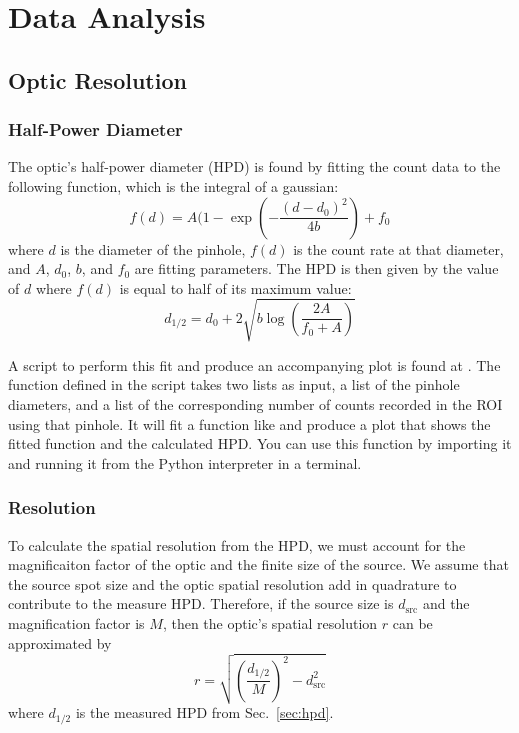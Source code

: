 \chapter{Data Analysis}



\section{Optic Resolution\label{sec:res}}

\subsection{Half-Power Diameter\label{sec:hpd}}

The optic's half-power diameter (HPD) is found by fitting the count data to
the following function, which is the integral of a gaussian:
\begin{equation}
  f(d) = A(1-\exp{\left(-\frac{(d-d_0)^2}{4b}\right)} + f_0
    \label{eq:hpd_fit}
\end{equation}
where $d$ is the diameter of the pinhole, $f(d)$ is the count rate at
that diameter, and $A$, $d_0$, $b$, and $f_0$ are fitting
parameters. The HPD is then given by the value of $d$ where $f(d)$ is
equal to half of its maximum value:
\begin{equation}
  \label{eq:hpd}
  d_{1/2} = d_0 + 2 \sqrt{b \log{ \left( \frac{2A}{f_0 + A} \right)}}
\end{equation}

A script to perform this fit and produce an accompanying plot is found at
. The  function defined in the
script takes two lists as input, a list of the pinhole diameters, and a list of
the corresponding number of counts recorded in the ROI using that pinhole. It
will fit a function like \label{eq:hpd_fit} and produce a plot that shows the
fitted function and the calculated HPD. You can use this function by importing
it and running it from the Python interpreter in a terminal.


\subsection{Resolution}

To calculate the spatial resolution from the HPD, we must account for the
magnificaiton factor of the optic and the finite size of the source.  We assume
that the source spot size and the optic spatial resolution add in quadrature to
contribute to the measure HPD. Therefore, if the source size is $d_\text{src}$
and the magnification factor is $M$, then the optic's spatial resolution $r$ can
be approximated by
\begin{equation}
  \label{eq:sp_res}
  r = \sqrt{ \left( \frac{d_{1/2}}{M} \right)^2 - d_\text{src}^2 }
\end{equation}
where $d_{1/2}$ is the measured HPD from Sec.~\ref{sec:hpd}.

